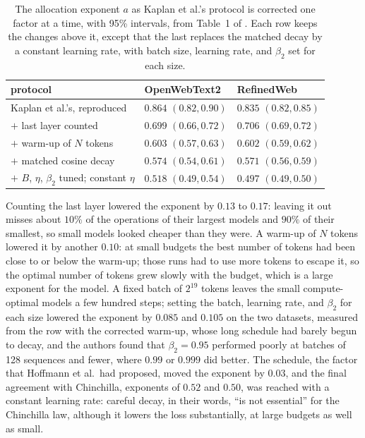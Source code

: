 \begin{refsection}
\begin{table}[t]
\centering\small
\begin{tabular}{lll}
\toprule
protocol & OpenWebText2 & RefinedWeb\\
\midrule
Kaplan et al.'s, reproduced & $0.864$ $(0.82,0.90)$ & $0.835$ $(0.82,0.85)$\\
$+$ last layer counted & $0.699$ $(0.66,0.72)$ & $0.706$ $(0.69,0.72)$\\
$+$ warm-up of $N$ tokens & $0.603$ $(0.57,0.63)$ & $0.602$ $(0.59,0.62)$\\
$+$ matched cosine decay & $0.574$ $(0.54,0.61)$ & $0.571$ $(0.56,0.59)$\\
$+$ $B$, $\eta$, $\beta_2$ tuned; constant $\eta$ & $0.518$ $(0.49,0.54)$ & $0.497$ $(0.49,0.50)$\\
\bottomrule
\end{tabular}
\caption{The allocation exponent $a$ as Kaplan et al.'s protocol is corrected one factor at a time, with 95\% intervals, from Table~1 of \textcite{PorianEtAl2024}. Each row keeps the changes above it, except that the last replaces the matched decay by a constant learning rate, with batch size, learning rate, and $\beta_2$ set for each size.}
\label{tab:protocol:porian}
\end{table}

Counting the last layer lowered the exponent by $0.13$ to $0.17$: leaving it out misses about $10\%$ of the operations of their largest models and $90\%$ of their smallest, so small models looked cheaper than they were. A warm-up of $N$ tokens lowered it by another $0.10$: at small budgets the best number of tokens had been close to or below the warm-up; those runs had to use more tokens to escape it, so the optimal number of tokens grew slowly with the budget, which is a large exponent for the model. A fixed batch of $2^{19}$ tokens leaves the small compute-optimal models a few hundred steps; setting the batch, learning rate, and $\beta_2$ for each size lowered the exponent by $0.085$ and $0.105$ on the two datasets, measured from the row with the corrected warm-up, whose long schedule had barely begun to decay, and the authors found that $\beta_2=0.95$ performed poorly at batches of 128 sequences and fewer, where $0.99$ or $0.999$ did better. The schedule, the factor that Hoffmann et al.\ had proposed, moved the exponent by $0.03$, and the final agreement with Chinchilla, exponents of $0.52$ and $0.50$, was reached with a constant learning rate: careful decay, in their words, \enquote{is not essential} for the Chinchilla law, although it lowers the loss substantially, at large budgets as well as small.


\end{refsection}
